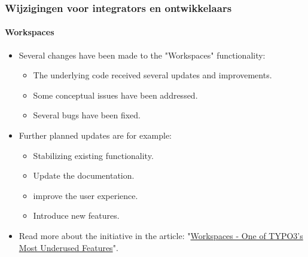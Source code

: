 %

\begin{frame}[fragile]
	\frametitle{Wijzigingen voor integrators en ontwikkelaars}
	\framesubtitle{Workspaces}

	\begin{itemize}
		\item Several changes have been made to the "Workspaces" functionality:

			\begin{itemize}
				\item The underlying code received several updates and improvements.
				\item Some conceptual issues have been addressed.
				\item Several bugs have been fixed.
			\end{itemize}

		\item Further planned updates are for example:

			\begin{itemize}
				\item Stabilizing existing functionality.
				\item Update the documentation.
				\item improve the user experience.
				\item Introduce new features.
			\end{itemize}

		\item Read more about the initiative in the article:\newline
			"\href{https://typo3.org/article/workspaces-one-of-typo3s-most-underused-features}{Workspaces - One of TYPO3's Most Underused Features}".

	\end{itemize}

\end{frame}

